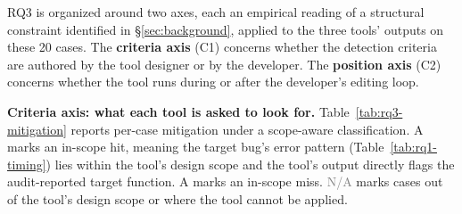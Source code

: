 \documentclass[pdflatex,sn-basic]{sn-jnl}%
\theoremstyle{thmstyleone}%
\theoremstyle{thmstyletwo}%
\theoremstyle{thmstylethree}%
\begin{document}
RQ3 is organized around two axes, each an empirical reading of a structural constraint identified in \S\ref{sec:background}, applied to the three tools' outputs on these 20 cases. The \textbf{criteria axis} (C1) concerns whether the detection criteria are authored by the tool designer or by the developer. The \textbf{position axis} (C2) concerns whether the tool runs during or after the developer's editing loop.

\smallskip
\noindent\textbf{Criteria axis: what each tool is asked to look for.}
Table~\ref{tab:rq3-mitigation} reports per-case mitigation under a scope-aware classification. A  marks an in-scope hit, meaning the target bug's error pattern (Table~\ref{tab:rq1-timing}) lies within the tool's design scope and the tool's output directly flags the audit-reported target function. A  marks an in-scope miss. \textcolor{gray}{N/A} marks cases out of the tool's design scope or where the tool cannot be applied.
\end{document}
